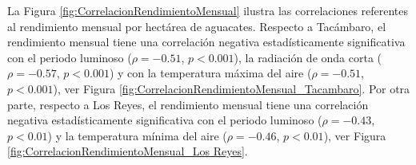 La Figura \ref{fig:CorrelacionRendimientoMensual} ilustra las correlaciones referentes al rendimiento mensual por hectárea de aguacates. Respecto a Tacámbaro, el rendimiento mensual tiene una correlación negativa estadísticamente significativa con el periodo luminoso ($\rho =-0.51$, $p<0.001$), la radiación de onda corta ($\rho =-0.57$, $p<0.001$) y con la temperatura máxima del aire ($\rho = -0.51$, $p<0.001$), ver Figura \ref{fig:CorrelacionRendimientoMensual_Tacambaro}. Por otra parte, respecto a Los Reyes, el rendimiento mensual tiene una correlación negativa estadísticamente significativa con el periodo luminoso ($\rho =-0.43$, $p<0.01$) y la temperatura mínima del aire  ($\rho =-0.46$, $p<0.01$), ver Figura \ref{fig:CorrelacionRendimientoMensual_Los Reyes}.\\


\begin{figure}[ht]
\centering
{}
\hfill
{}
\end{figure}
